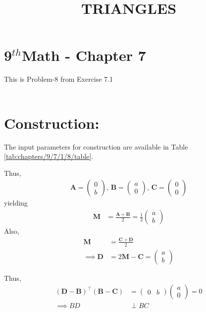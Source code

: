 \documentclass[10pt]{article}
\providecommand{\brak}[1]{\ensuremath{\left(#1\right)}}
\newcommand{\solution}{\noindent \textbf{Solution: }}
\newcommand{\myvec}[1]{\ensuremath{\begin{pmatrix}#1\end{pmatrix}}}
\let\vec\mathbf{}
\begin{document}
\begin{center}
\title{\textbf{TRIANGLES}}
\date{\vspace{-5ex}}
\maketitle
\end{center}
\section*{9$^{th}$Math - Chapter 7}
This is Problem-8 from Exercise 7.1\\\\


\section*{\large Construction:}
\fi
The input parameters for construction
	are available in Table \ref{tab:chapters/9/7/1/8/table}.
\begin{table}[h!]
	\centering
     
	\caption{}
	\label{tab:chapters/9/7/1/8/table}
\end{table}
Thus, 
\begin{align}
	\vec{A}=\myvec{0\\b},\,
	\vec{B}=\myvec{a\\0},\,
	\vec{C}=\myvec{0\\0}
\end{align}
yielding
\begin{align}
	\vec{M}&=\frac{\vec{A}+\vec{B}}{2}=\frac{1}{2}\myvec{a\\b}
\end{align}
Also, 
\begin{align}
	\vec{M}&=\frac{\vec{C}+\vec{D}}{2}\\
	\implies \vec{D}&=2\vec{M}-\vec{C}=\myvec{a\\b}
\end{align}

Thus,
\begin{align}
	\brak{\vec{D}-\vec{B}}^{\top}\brak{\vec{B}-\vec{C}} &= \myvec{0 & b}\myvec{a\\0}=0\\
	\implies BD & \perp BC\\
\end{align}
\end{document}
